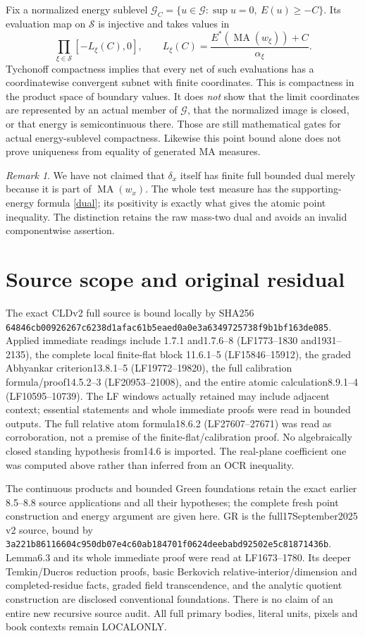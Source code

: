 \documentclass[11pt]{article}
\newcommand{\MA}{\operatorname{MA}}
\newcommand{\G}{\mathcal G}
\theoremstyle{remark}\newtheorem{remark}[theorem]{Remark}
\begin{document}
Fix a normalized energy sublevel
$\G_C=\{u\in\G:\sup u=0,\ E(u)\ge-C\}$.
Its evaluation map on $\mathscr S$ is injective and takes values in
\[
 \prod_{\xi\in\mathscr S}[-L_\xi(C),0],\qquad
 L_\xi(C)=\frac{E^*(\MA(w_\xi))+C}{\alpha_\xi}.
\]
Tychonoff compactness implies that every net of such evaluations
has a coordinatewise convergent subnet with finite coordinates.
This is compactness in the product space of boundary values.
It does \emph{not} show that the limit coordinates are represented
by an actual member of $\G$, that the normalized image is closed,
or that energy is semicontinuous there. Those are still mathematical
gates for actual energy-sublevel compactness.
Likewise this point bound alone does not prove uniqueness from
equality of generated MA measures.

\begin{remark}
We have not claimed that $\delta_x$ itself has finite full bounded
dual merely because it is part of $\MA(w_x)$.
The whole test measure has the supporting-energy formula
\eqref{dual}; its positivity is exactly what gives the atomic
point inequality. The distinction retains the raw mass-two dual
and avoids an invalid componentwise assertion.
\end{remark}

\section{Source scope and original residual}
The exact CLDv2 full source is bound locally by SHA256
\texttt{64846cb00926267c6238d1afac61b5eaed0a0e3a6349725738f9b1bf163de085}.
Applied immediate readings include 1.7.1 and1.7.6--8
(LF1773--1830 and1931--2135), the complete local finite-flat block
11.6.1--5 (LF15846--15912), the graded Abhyankar criterion13.8.1--5
(LF19772--19820), the full calibration formula/proof14.5.2--3
(LF20953--21008), and the entire atomic calculation8.9.1--4
(LF10595--10739). The LF windows actually retained may include
adjacent context; essential statements and whole immediate proofs
were read in bounded outputs. The full relative atom formula18.6.2
(LF27607--27671) was read as corroboration, not a premise of the
finite-flat/calibration proof.
No algebraically closed standing hypothesis from14.6 is imported.
The real-plane coefficient one was computed above rather than
inferred from an OCR inequality.

The continuous products and bounded Green foundations retain the
exact earlier 8.5--8.8 source applications and all their hypotheses;
the complete fresh point construction and energy argument are
given here. GR is the full17September2025 v2 source, bound by
\texttt{3a221b86116604c950db07e4c60ab184701f0624deebabd92502e5c81871436b}.
Lemma6.3 and its whole immediate proof were read at LF1673--1780.
Its deeper Temkin/Ducros reduction proofs, basic Berkovich
relative-interior/dimension and completed-residue facts, graded
field transcendence, and the analytic quotient construction are
disclosed conventional foundations. There is no claim of an
entire new recursive source audit. All full primary bodies,
literal units, pixels and book contexts remain LOCALONLY.
\end{document}
